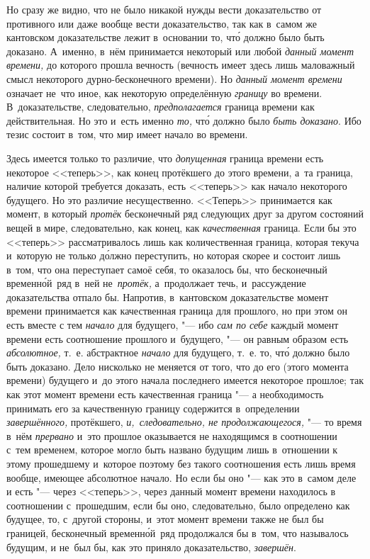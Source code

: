 Но сразу же видно, что не было никакой нужды вести доказательство от противного
или даже вообще вести доказательство, так как в~самом же кантовском
доказательстве лежит в~основании то, чт\'{о} должно было быть доказано. А~именно,
в~нём принимается некоторый или любой {\em данный момент времени,} до которого
прошла вечность (вечность имеет здесь лишь маловажный смысл некоторого
дурно-бесконечного времени). Но {\em данный момент времени} означает
не~что иное, как некоторую определённую {\em границу} во времени.
В~доказательстве, следовательно, {\em предполагается} граница времени как
действительная. Но это и~есть именно {\em то,} чт\'{о} должно было
{\em быть доказано}. Ибо тезис состоит в~том, что мир имеет начало во времени.

Здесь имеется только то различие, что {\em допущенная} граница времени есть
некоторое <<теперь>>, как конец протёкшего до этого времени, а~та граница,
наличие которой требуется доказать, есть <<теперь>> как начало некоторого
будущего. Но это различие несущественно. <<Теперь>> принимается как момент,
в который {\em протёк} бесконечный ряд следующих друг за другом состояний вещей
в мире, следовательно, как конец, как {\em качественная} граница. Если бы это
<<теперь>> рассматривалось лишь как количественная граница, которая
текуча и~которую не только д\'{о}лжно переступить, но которая скорее и
состоит лишь в~том, что она переступает самоё себя, то оказалось бы, что бесконечный
временн\'{о}й~ряд в~ней не~{\em протёк,} а~продолжает течь, и~рассуждение
доказательства отпало бы. Напротив, в~кантовском доказательстве момент времени
принимается как качественная граница для прошлого, но при этом он есть вместе
с тем {\em начало} для будущего, "--- ибо {\em сам по себе} каждый момент
времени есть соотношение прошлого и~будущего, "--- он равным образом есть
{\em абсолютное,} т.~е. абстрактное {\em начало} для будущего, т.~е. то, чт\'{о}
должно было быть доказано. Дело нисколько не меняется от того, что до его
(этого момента времени) будущего и~до этого начала последнего имеется некоторое
прошлое; так как этот момент времени есть качественная граница "--- а
необходимость принимать его за качественную границу содержится в~определении
{\em завершённого,} протёкшего, {\em и,~следовательно, не продолжающегося,}
"--- то время в~нём {\em прервано} и~это прошлое оказывается не находящимся
в соотношении с~тем временем, которое могло быть названо будущим лишь в~отношении
к этому прошедшему и~которое поэтому без такого соотношения есть лишь время
вообще, имеющее абсолютное начало. Но если бы оно "--- как это в~самом деле
и есть "--- через <<теперь>>, через данный момент времени находилось
в соотношении с~прошедшим, если бы оно, следовательно, было определено как
будущее, то, с~другой стороны, и~этот момент времени также не был бы границей,
бесконечный временн\'{о}й~ряд продолжался бы в~том, что называлось будущим, и
не~был бы, как это приняло доказательство, {\em завершён}.

